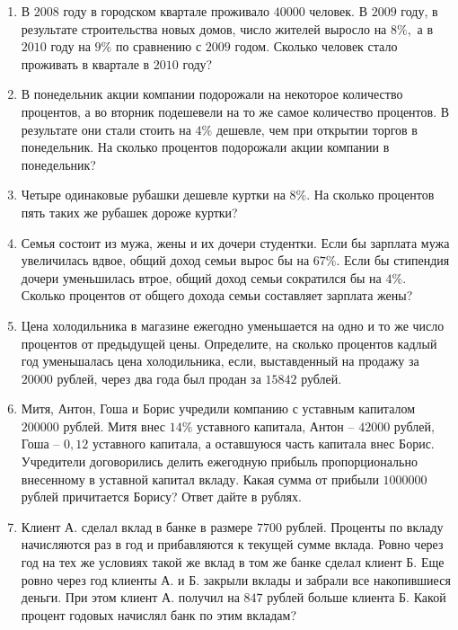 \documentclass[12pt, a4paper]{article}
\begin{document}
	
	\begin{enumerate}
		\item В $2008$ году в городском квартале проживало $40 000$ человек. В $2009$ году, в результате строительства новых домов, число жителей выросло на $8 \%,$ а в $2010$ году на $9 \%$ по сравнению с $2009$ годом. Сколько человек стало проживать в квартале в $2010$ году?
		\item В понедельник акции компании подорожали на некоторое количество процентов, а во вторник подешевели на то же самое количество процентов. В результате они стали стоить на $4 \%$ дешевле, чем при открытии торгов в понедельник. На сколько процентов подорожали акции компании в понедельник?
		\item Четыре одинаковые рубашки дешевле куртки на $8\%$. На сколько процентов пять таких же рубашек дороже куртки?
		\item Семья состоит из мужа, жены и их дочери студентки. Если бы зарплата мужа увеличилась вдвое, общий доход семьи вырос бы на $67\%$. Если бы стипендия дочери уменьшилась втрое, общий доход семьи сократился бы на $4\%$. Сколько процентов от общего дохода семьи составляет зарплата жены?
		\item Цена холодильника в магазине ежегодно уменьшается на одно и то же число процентов от предыдущей цены. Определите, на сколько процентов кадлый год уменьшалась цена холодильника, если, выставденный на продажу за $20 000$ рублей, через два года был продан за $15 842$ рублей.
		\item Митя, Антон, Гоша и Борис учредили компанию с уставным капиталом $200 000$ рублей. Митя внес $14\%$ уставного капитала, Антон – $42 000$ рублей, Гоша – $0,12$ уставного капитала, а оставшуюся часть капитала внес Борис. Учредители договорились делить ежегодную прибыль пропорционально внесенному в уставной капитал вкладу. Какая сумма от прибыли $1 000 000$ рублей причитается Борису? Ответ дайте в рублях.
		\item Клиент А. сделал вклад в банке в размере $7700$ рублей. Проценты по вкладу начисляются раз в год и прибавляются к текущей сумме вклада. Ровно через год на тех же условиях такой же вклад в том же банке сделал клиент Б. Еще ровно через год клиенты А. и Б. закрыли вклады и забрали все накопившиеся деньги. При этом клиент А. получил на $847$ рублей больше клиента Б. Какой процент годовых начислял банк по этим вкладам?
	\end{enumerate}
\end{document}
